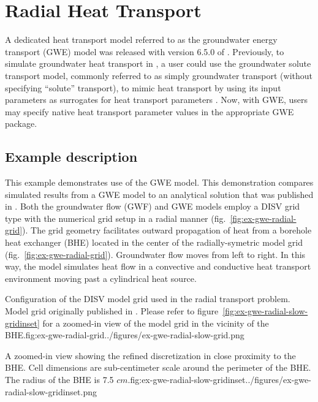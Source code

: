 \section{Radial Heat Transport}

A dedicated heat transport model referred to as the groundwater energy transport (GWE) model was released with version 6.5.0 of \mf. Previously, to simulate groundwater heat transport in \mf, a user could use the groundwater solute transport model, commonly referred to as simply groundwater transport (without specifying ``solute'' transport), to mimic heat transport by using its input parameters as surrogates for heat transport parameters \citep{modflow6gwt, ma2010, langevin2008seawat}. Now, with GWE, users may specify native heat transport parameter values in the appropriate GWE package.

\subsection{Example description}

This example demonstrates use of the GWE model.  This demonstration compares simulated results from a GWE model to an analytical solution that was published in \cite{alKhoury2020}.  Both the groundwater flow (GWF) and GWE models employ a DISV grid type \citep{modflow6software} with the numerical grid setup in a radial manner (fig.~\ref{fig:ex-gwe-radial-grid}). The grid geometry facilitates outward propagation of heat from a borehole heat exchanger (BHE) \citep{hechtMendez2010} located in the center of the radially-symetric model grid (fig.~\ref{fig:ex-gwe-radial-grid}). Groundwater flow moves from left to right. In this way, the model simulates heat flow in a convective and conductive heat transport environment moving past a cylindrical heat source.

\begin{StandardFigure}{
    Configuration of the DISV model grid used in the radial transport problem.  Model grid originally published in \cite{alKhoury2020}.  Please refer to figure~\ref{fig:ex-gwe-radial-slow-gridinset} for a zoomed-in view of the model grid in the vicinity of the BHE.}{fig:ex-gwe-radial-grid}{../figures/ex-gwe-radial-slow-grid.png}
\end{StandardFigure}

\begin{StandardFigure}{
    A zoomed-in view showing the refined discretization in close proximity to the BHE.  Cell dimensions are sub-centimeter scale around the perimeter of the BHE.  The radius of the BHE is 7.5 $cm$.}{fig:ex-gwe-radial-slow-gridinset}{../figures/ex-gwe-radial-slow-gridinset.png}
\end{StandardFigure}

